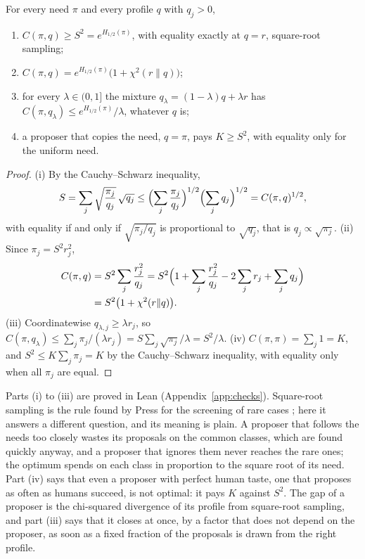 \begin{mainthm}\label{thm:I}
For every need $\pi$ and every profile $q$ with $q_{j}>0$,
\begin{enumerate}[label=\textup{(\roman*)},leftmargin=2.2em,itemsep=1pt]
\item $C(\pi,q)\ge S^{2}=e^{H_{1/2}(\pi)}$, with equality exactly at $q=r$, square-root sampling;
\item $C(\pi,q)=e^{H_{1/2}(\pi)}\bigl(1+\chi^{2}(r\|q)\bigr)$;
\item for every $\lambda\in(0,1]$ the mixture $q_{\lambda}=(1-\lambda)q+\lambda r$ has $C(\pi,q_{\lambda})\le e^{H_{1/2}(\pi)}/\lambda$, whatever $q$ is;
\item a proposer that copies the need, $q=\pi$, pays $K\ge S^{2}$, with equality only for the uniform need.
\end{enumerate}
\end{mainthm}

\begin{proof}
(i) By the Cauchy--Schwarz inequality,
\[
S=\sum_{j}\sqrt{\frac{\pi_{j}}{q_{j}}}\,\sqrt{q_{j}}\le\Bigl(\sum_{j}\frac{\pi_{j}}{q_{j}}\Bigr)^{1/2}\Bigl(\sum_{j}q_{j}\Bigr)^{1/2}=C(\pi,q)^{1/2},
\]
with equality if and only if $\sqrt{\pi_{j}/q_{j}}$ is proportional to $\sqrt{q_{j}}$, that is $q_{j}\propto\sqrt{\pi_{j}}$. (ii) Since $\pi_{j}=S^{2}r_{j}^{2}$,
\[
\begin{aligned}C(\pi,q)&=S^{2}\sum_{j}\frac{r_{j}^{2}}{q_{j}}=S^{2}\Bigl(1+\sum_{j}\frac{r_{j}^{2}}{q_{j}}-2\sum_{j}r_{j}+\sum_{j}q_{j}\Bigr)\\&=S^{2}\bigl(1+\chi^{2}(r\|q)\bigr).\end{aligned}
\]
(iii) Coordinatewise $q_{\lambda,j}\ge\lambda r_{j}$, so $C(\pi,q_{\lambda})\le\sum_{j}\pi_{j}/(\lambda r_{j})=S\sum_{j}\sqrt{\pi_{j}}/\lambda=S^{2}/\lambda$. (iv) $C(\pi,\pi)=\sum_{j}1=K$, and $S^{2}\le K\sum_{j}\pi_{j}=K$ by the Cauchy--Schwarz inequality, with equality only when all $\pi_{j}$ are equal.
\end{proof}

Parts (i) to (iii) are proved in Lean (Appendix~\ref{app:checks}). Square-root sampling is the rule found by Press for the screening of rare cases \cite{Pre09}; here it answers a different question, and its meaning is plain. A proposer that follows the needs too closely wastes its proposals on the common classes, which are found quickly anyway, and a proposer that ignores them never reaches the rare ones; the optimum spends on each class in proportion to the square root of its need. Part (iv) says that even a proposer with perfect human taste, one that proposes as often as humans succeed, is not optimal: it pays $K$ against $S^{2}$. The gap of a proposer is the chi-squared divergence of its profile from square-root sampling, and part (iii) says that it closes at once, by a factor that does not depend on the proposer, as soon as a fixed fraction of the proposals is drawn from the right profile.

